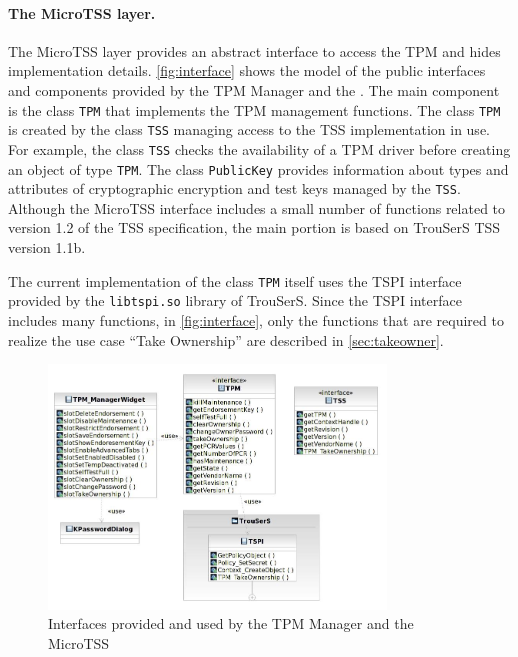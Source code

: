 \documentclass[
  american        %
]{sirrixreport}
\begin{document}
\paragraph{The MicroTSS layer.} The MicroTSS layer provides an abstract interface to access the TPM
and hides implementation details. \autoref{fig:interface} shows the \UML model
of the public interfaces and components provided by the TPM Manager and the \TSPI. The main component is the class \lstinline'TPM' that implements the TPM management
functions. The class \lstinline'TPM' is created by the class \lstinline'TSS' managing access to the TSS implementation in
use. For example, the class \lstinline'TSS' checks the availability of a TPM driver before creating an object
of type \lstinline'TPM'. The class \lstinline'PublicKey' provides information about types and attributes of cryptographic
encryption and test keys managed by the \lstinline'TSS'. Although the MicroTSS interface includes a small
number of functions related to version 1.2 of the TSS specification\cite{TSS_1.2}, the main portion is based on
TrouSerS TSS version 1.1b\cite{TSS_1.1}.


The current implementation of the class \lstinline'TPM' itself uses the TSPI interface provided by the \lstinline'libtspi.so'
library of TrouSerS. Since the TSPI interface includes many functions, in \autoref{fig:interface}, only the 
functions that are required to realize the use case ``Take Ownership'' are described in \autoref{sec:takeowner}.

\begin{figure}[h]
 \centering
 \includegraphics[width=0.8\textwidth]{images/tpmmanager_interfaces.jpg}
 \caption{Interfaces provided and used by the TPM Manager and the MicroTSS}
 \label{fig:interface}
\end{figure}
\clearpage
\end{document}
